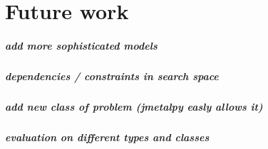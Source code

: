 \chapter{Future work}
\paragraph{add more sophisticated models}
\paragraph{dependencies / constraints in search space}
\paragraph{add new class of problem (jmetalpy easly allows it)}
\paragraph{evaluation on different types and classes}

